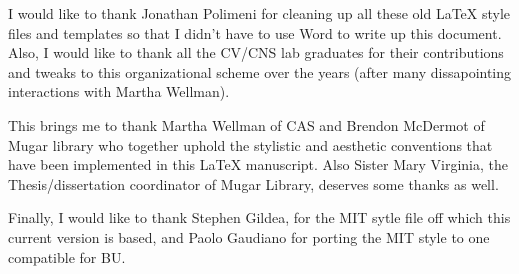 I would like to thank Jonathan Polimeni for cleaning up all these old
LaTeX style files and templates so that I didn't have to use Word to
write up this document. Also, I would like to thank all the CV/CNS lab
graduates for their contributions and tweaks to this organizational
scheme over the years (after many dissapointing interactions with
Martha Wellman).

This brings me to thank Martha Wellman of CAS and Brendon McDermot of
Mugar library who together uphold the stylistic and aesthetic
conventions that have been implemented in this LaTeX manuscript. Also
Sister Mary Virginia, the Thesis/dissertation coordinator of Mugar
Library, deserves some thanks as well.

Finally, I would like to thank Stephen Gildea, for the MIT sytle file
off which this current version is based, and Paolo Gaudiano for
porting the MIT style to one compatible for BU.
